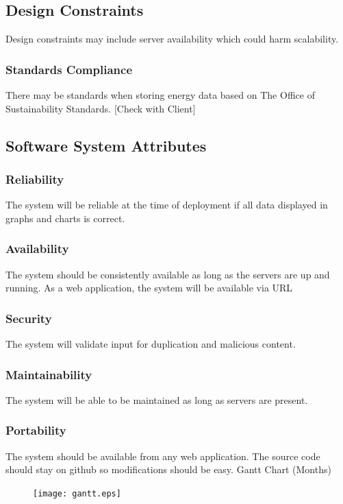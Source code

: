 \documentclass[onecolumn, draftclsnofoot,10pt, compsoc]{IEEEtran}
\begin{document}
    \subsection{Design Constraints}
    Design constraints may include server availability which could harm scalability.
    \subsubsection{Standards Compliance}
    There may be standards when storing energy data based on The Office of Sustainability Standards.
    [Check with Client]

    \subsection{Software System Attributes}
    
    \subsubsection{Reliability}
    The system will be reliable at the time of deployment if all data displayed in graphs and charts is correct.\\
    \subsubsection{Availability}
    The system should be consistently available as long as the servers are up and running. As a web application, the system will be available via URL 
    \subsubsection{Security}
    The system will validate input for duplication and malicious content.\\
    \subsubsection{Maintainability}
    The system will be able to be maintained as long as servers are present.
    \subsubsection{Portability}
    The system should be available from any web application. The source code should stay on github so modifications should be easy.
    Gantt Chart (Months)\\ 
    \begin{figure}[H]
        \centering
        \texttt{[image: gantt.eps]}
    \end{figure}

    
    
\end{document}
